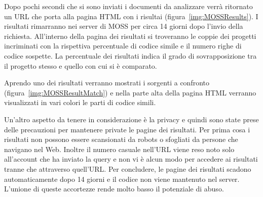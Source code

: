 			Dopo pochi secondi che si sono inviati i documenti da analizzare verrà ritornato un URL che porta alla pagina HTML con i risultai (figura~\ref{img:MOSSResults}). I risultati rimarranno nei server di MOSS per circa 14 giorni dopo l'invio della richiesta. All'interno della pagina dei risultati si troveranno le coppie dei progetti incriminati con la rispettiva percentuale di codice simile e il numero righe di codice sospette. La percentuale dei risultati indica il grado di sovrapposizione tra il progetto stesso e quello con cui si è comparato.
			
			\begin{center}
				\label{img:MOSSResults}
			\end{center}
			
			Aprendo uno dei risultati verranno mostrati i sorgenti a confronto (figura~\ref{img:MOSSResultMatch}) e nella parte alta della pagina HTML verranno visualizzati in vari colori le parti di codice simili.
			\begin{center}
				\label{img:MOSSResultMatch}
			\end{center}
			
			Un'altro aspetto da tenere in considerazione è la privacy e quindi sono state prese delle precauzioni per mantenere private le pagine dei risultati. Per prima cosa i risultati non possono essere scansionati da robots o sfogliati da persone che navigano nel Web. Inoltre il numero casuale nell'URL viene reso noto solo all'account che ha inviato la query e non vi è alcun modo per accedere ai risultati tranne che attraverso quell'URL. Per concludere, le pagine dei risultati scadono automaticamente dopo 14 giorni e il codice non viene mantenuto nel server. L'unione di queste accortezze rende molto basso il potenziale di abuso.